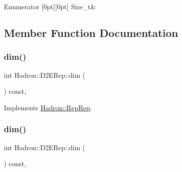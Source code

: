 \begin{DoxyEnumFields}{Enumerator}
[0pt][0pt]{}\mbox{\label{structHadron_1_1D2ERep_a21ad3f4d658f5bebe21944ee1908bae0aa7f003f5542c1af092cee55a485251fc}} 
Size\+\_\+t&\\
\hline

\end{DoxyEnumFields}


\subsection{Member Function Documentation}
\mbox{\label{structHadron_1_1D2ERep_acf6c72a31e0813079ddaea61133600e4}} 
\subsubsection{\texorpdfstring{dim()}{dim()}\hspace{0.1cm}{\footnotesize\ttfamily [1/3]}}
{\footnotesize\ttfamily int Hadron\+::\+D2\+E\+Rep\+::dim (\begin{DoxyParamCaption}{ }\end{DoxyParamCaption}) const\hspace{0.3cm}{\ttfamily [inline]}, {\ttfamily [virtual]}}



Implements \mbox{\hyperlink{structHadron_1_1RepRep_a92c8802e5ed7afd7da43ccfd5b7cd92b}{Hadron\+::\+Rep\+Rep}}.

\mbox{\label{structHadron_1_1D2ERep_acf6c72a31e0813079ddaea61133600e4}} 
\subsubsection{\texorpdfstring{dim()}{dim()}\hspace{0.1cm}{\footnotesize\ttfamily [2/3]}}
{\footnotesize\ttfamily int Hadron\+::\+D2\+E\+Rep\+::dim (\begin{DoxyParamCaption}{ }\end{DoxyParamCaption}) const\hspace{0.3cm}{\ttfamily [inline]}, {\ttfamily [virtual]}}



